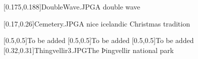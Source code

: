 



\graphicspath{{Figures/}{Figures/Iceland/}}


\subtitle{Day 5}
\date{30.10.2019}


    
    [0.175,0.188]{DoubleWave.JPG}{A double wave}
    
    
    [0.17,0.26]{Cemetery.JPG}{A nice icelandic Christmas tradition}
    
    [0.5,0.5]{}{To be added}
    [0.5,0.5]{}{To be added}
    [0.5,0.5]{}{To be added}
    [0.32,0.31]{Thingvellir3.JPG}{The Þingvellir national park}
    

